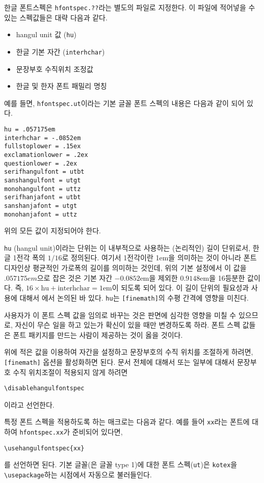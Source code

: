 한글 폰트스펙은 \verb|hfontspec.??|라는 별도의 파일로 지정한다.
이 파일에 적어넣을 수 있는 스펙값들은 대략 다음과 같다.
\begin{itemize}
\item hangul unit 값 (\verb|hu|)
\item 한글 기본 자간 (\verb|interhchar|)
\item 문장부호 수직위치 조정값
\item 한글 및 한자 폰트 패밀리 명칭
\end{itemize}
예를 들면, \verb|hfontspec.ut|이라는 기본 글꼴 폰트 스펙의 내용은
다음과 같이 되어 있다.
\begin{Verbatim}[fontsize=\small]
hu = .057175em
interhchar = -.0852em
fullstoplower = .15ex
exclamationlower = .2ex
questionlower = .2ex
serifhangulfont = utbt
sanshangulfont = utgt
monohangulfont = uttz
serifhanjafont = utbt
sanshanjafont = utgt
monohanjafont = uttz
\end{Verbatim}
위의 모든 값이 지정되어야 한다.

\texttt{hu} (hangul unit)이라는 단위는 \kotex 이 내부적으로 사용하는
(논리적인) 길이 단위로서, 한글 1전각 폭의 $1/16$로 정의된다. 여기서 1전각이란
1em을 의미하는 것이 아니라 폰트 디자인상 평균적인 가로폭의 길이를
의미하는 것인데, 위의 기본 설정에서 이 값을 $.057175em$으로
잡은 것은  기본 자간 $-0.0852\text{em}$을 제외한 $0.9148\text{em}$을
16등분한 값이다. 즉, $16\times \mbox{hu} + \mbox{interhchar} = 1\mbox{em}$이 되도록 되어 있다.
이 길이 단위의 필요성과 사용에 대해서 \cite{karnes2007}에서 논의된 바 있다.
\texttt{hu}는 \texttt{[finemath]}의 수평 간격에 영향을 미친다.

사용자가 이 폰트 스펙 값을 임의로
바꾸는 것은 판면에 심각한 영향을 미칠 수 있으므로, 자신이 무슨 일을
하고 있는가 확신이 있을 때만 변경하도록 하라. 폰트 스펙 값들은
폰트 패키지를 만드는 사람이 제공하는 것이 옳을 것이다.

위에 적은 값을 이용하여 자간을 설정하고 문장부호의
수직 위치를 조절하게 하려면, \verb|[finemath]| 옵션을
활성화하면 된다. 문서 전체에 대해서 또는 일부에 대해서 
문장부호 수직 위치조절이 적용되지 않게 하려면 
\begin{verbatim}
\disablehangulfontspec
\end{verbatim}
이라고 선언한다.

특정 폰트 스펙을 적용하도록 하는 매크로는 다음과 같다.
예를 들어 \texttt{xx}라는 폰트에
대하여 \texttt{hfontspec.xx}가 준비되어 있다면,
\begin{verbatim}
\usehangulfontspec{xx}
\end{verbatim}
를 선언하면 된다.
기본 글꼴(은 글꼴 type 1)에 대한 폰트 스펙(\verb|ut|)은 \texttt{kotex}을
\verb|\usepackage|하는 시점에서 자동으로 불러들인다.

